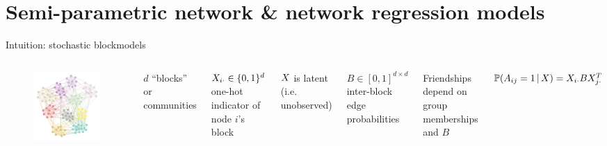 \documentclass{beamer}
\theoremstyle{remark}
\begin{document}
\section{Semi-parametric network \& network regression models}

\begin{frame}{Intuition: stochastic blockmodels}

    \begin{columns}

        \begin{figure}
            \includegraphics[width=\textwidth]{figures/assortative.png}
        \end{figure}


        $d$ ``blocks'' or communities

        $X_{i \cdot} \in \{0, 1\}^d$ one-hot indicator of node $i$'s block

        \vspace{4mm}

        $X$ is latent (i.e. unobserved)

        \vspace{4mm}

        $B \in [0, 1]^{d \times d}$ inter-block edge probabilities

        \vspace{4mm}

        Friendships depend on group memberships and $B$

        $\P[\X]{A_{ij} = 1} = \X_{i \cdot} B \X_{j \cdot}^T$

    \end{columns}

\end{frame}
\end{document}
